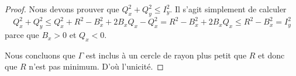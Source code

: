 \begin{proof}
    Nous devons prouver que \( Q_x^2+Q_y^2\leq I_y^2\). Il s'agit simplement de calculer
    \begin{equation}
        Q_x^2+Q_y^2\leq Q_x^2+R^2-B_x^2+2B_xQ_x-Q_x^2=R^2-B_x^2+2B_xQ_x\leq R^2-B_x^2=I_y^2
    \end{equation}
    parce que \( B_x>0\) et \( Q_x<0\).

    Nous concluons que \( \Gamma\) est inclus à un cercle de rayon plus petit que \( R\) et donc que \( R\) n'est pas minimum. D'où l'unicité.
\end{proof}
